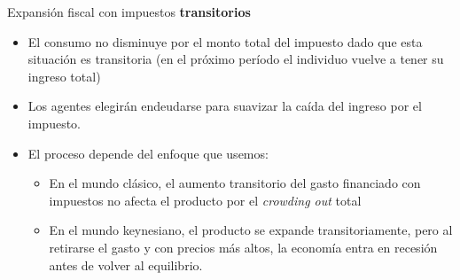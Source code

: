 \documentclass{beamer}
\begin{document}
\begin{frame}{Expansión fiscal con impuestos \textbf{transitorios}}
   \begin{itemize}
       \item El consumo no disminuye por el monto total del impuesto dado que esta situación es transitoria (en el próximo período el individuo vuelve a tener su ingreso total)
       \item Los agentes elegirán endeudarse para suavizar la caída del ingreso por el impuesto. 
       \item El proceso depende del enfoque que usemos:
        \begin{itemize}
        \item  En el mundo clásico, el aumento transitorio del gasto financiado con impuestos no afecta el producto por el \textit{crowding out} total
        \item En el mundo keynesiano, el producto se expande transitoriamente, pero al retirarse el gasto y con precios más altos, la economía entra en recesión antes de volver al equilibrio.
        \end{itemize}
   \end{itemize}
\end{frame}
\end{document}
